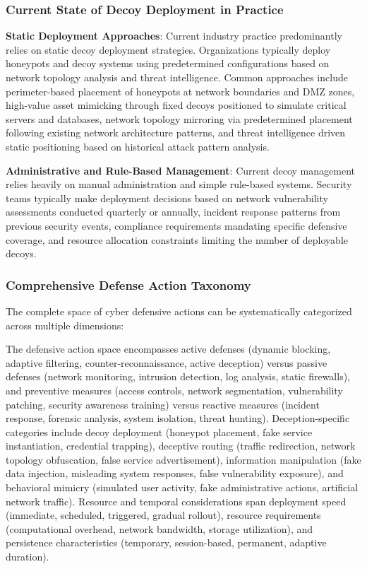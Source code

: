 \documentclass[12pt,oneside]{article}
\begin{document}
\subsubsection{Current State of Decoy Deployment in Practice}

\textbf{Static Deployment Approaches}: Current industry practice predominantly relies on static decoy deployment strategies. Organizations typically deploy honeypots and decoy systems using predetermined configurations based on network topology analysis and threat intelligence. Common approaches include perimeter-based placement of honeypots at network boundaries and DMZ zones, high-value asset mimicking through fixed decoys positioned to simulate critical servers and databases, network topology mirroring via predetermined placement following existing network architecture patterns, and threat intelligence driven static positioning based on historical attack pattern analysis.

\textbf{Administrative and Rule-Based Management}: Current decoy management relies heavily on manual administration and simple rule-based systems. Security teams typically make deployment decisions based on network vulnerability assessments conducted quarterly or annually, incident response patterns from previous security events, compliance requirements mandating specific defensive coverage, and resource allocation constraints limiting the number of deployable decoys.

\subsubsection{Comprehensive Defense Action Taxonomy}

The complete space of cyber defensive actions can be systematically categorized across multiple dimensions:

The defensive action space encompasses active defenses (dynamic blocking, adaptive filtering, counter-reconnaissance, active deception) versus passive defenses (network monitoring, intrusion detection, log analysis, static firewalls), and preventive measures (access controls, network segmentation, vulnerability patching, security awareness training) versus reactive measures (incident response, forensic analysis, system isolation, threat hunting). Deception-specific categories include decoy deployment (honeypot placement, fake service instantiation, credential trapping), deceptive routing (traffic redirection, network topology obfuscation, false service advertisement), information manipulation (fake data injection, misleading system responses, false vulnerability exposure), and behavioral mimicry (simulated user activity, fake administrative actions, artificial network traffic). Resource and temporal considerations span deployment speed (immediate, scheduled, triggered, gradual rollout), resource requirements (computational overhead, network bandwidth, storage utilization), and persistence characteristics (temporary, session-based, permanent, adaptive duration).
\end{document}
